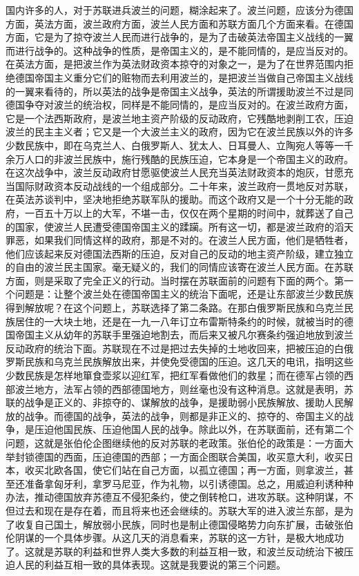 国内许多的人，对于苏联进兵波兰的问题，糊涂起来了。波兰问题，应该分为德国方面，英法方面，波兰政府方面，波兰人民方面和苏联方面几个方面来看。在德国方面，它是为了掠夺波兰人民而进行战争的，是为了击破英法帝国主义战线的一翼而进行战争的。这种战争的性质，是帝国主义的，是不能同情的，是应当反对的。在英法方面，是把波兰作为英法财政资本掠夺的对象之一，是为了在世界范围内拒绝德国帝国主义重分它们的赃物而去利用波兰的，是把波兰当做自己帝国主义战线的一翼来看待的，所以英法的战争是帝国主义战争，英法的所谓援助波兰不过是同德国争夺对波兰的统治权，同样是不能同情的，是应当反对的。在波兰政府方面，它是一个法西斯政府，是波兰地主资产阶级的反动政府，它残酷地剥削工农，压迫波兰的民主主义者；它又是一个大波兰主义的政府，因为它在波兰民族以外的许多少数民族中，即在乌克兰人、白俄罗斯人、犹太人、日耳曼人、立陶宛人等等一千余万人口的非波兰民族中，施行残酷的民族压迫，它本身是一个帝国主义的政府。在这次战争中，波兰反动政府甘愿驱使波兰人民充当英法财政资本的炮灰，甘愿充当国际财政资本反动战线的一个组成部分。二十年来，波兰政府一贯地反对苏联，在英法苏谈判中，坚决地拒绝苏联军队的援助。而这个政府又是一个十分无能的政府，一百五十万以上的大军，不堪一击，仅仅在两个星期的时间中，就葬送了自己的国家，使波兰人民遭受德国帝国主义的蹂躏。所有这一切，都是波兰政府的滔天罪恶，如果我们同情这样的政府，那是不对的。在波兰人民方面，他们是牺牲者，他们应该起来反对德国法西斯的压迫，反对自己的反动的地主资产阶级，建立独立的自由的波兰民主国家。毫无疑义的，我们的同情应该寄在波兰人民方面。在苏联方面，则是采取了完全正义的行动。当时摆在苏联面前的问题有下面的两个。第一个问题是：让整个波兰处在德国帝国主义的统治下面呢，还是让东部波兰少数民族得到解放呢？在这个问题上，苏联选择了第二条路。在那白俄罗斯民族和乌克兰民族居住的一大块土地，还是在一九一八年订立布雷斯特条约的时候，就被当时的德国帝国主义从幼年的苏联手里强迫地割去，而后来又被凡尔赛条约强迫地放到波兰反动政府的统治下面。苏联现在不过是把过去失掉的土地收回来，把被压迫的白俄罗斯民族和乌克兰民族解放出来，并使免受德国的压迫。这几天的电讯，指明这些少数民族是怎样地箪食壶浆以迎红军，把红军看做他们的救星；而在德军占领的西部波兰地方，法军占领的西部德国地方，则丝毫也没有这种消息。这就是表明，苏联的战争是正义的、非掠夺的、谋解放的战争，是援助弱小民族解放、援助人民解放的战争。而德国的战争，英法的战争，则都是非正义的、掠夺的、帝国主义的战争，是压迫他国民族、压迫他国人民的战争。除此以外，在苏联面前，还有第二个问题，这就是张伯伦企图继续他的反对苏联的老政策。张伯伦的政策是：一方面大举封锁德国的西面，压迫德国的西部；一方面企图联合美国，收买意大利，收买日本，收买北欧各国，使它们站在自己方面，以孤立德国；再一方面，则拿波兰，甚至还准备拿匈牙利，拿罗马尼亚，作为礼物，以引诱德国。总之，用威迫利诱种种办法，推动德国放弃苏德互不侵犯条约，使之倒转枪口，进攻苏联。这种阴谋，不但过去和现在是存在着，而且将来也还会继续的。苏联大军的进入波兰东部，是为了收复自己国土，解放弱小民族，同时也是制止德国侵略势力向东扩展，击破张伯伦阴谋的一个具体步骤。从这几天的消息看来，苏联的这一方针，是极大地成功了。这就是苏联的利益和世界人类大多数的利益互相一致，和波兰反动统治下被压迫人民的利益互相一致的具体表现。这就是我要说的第三个问题。

